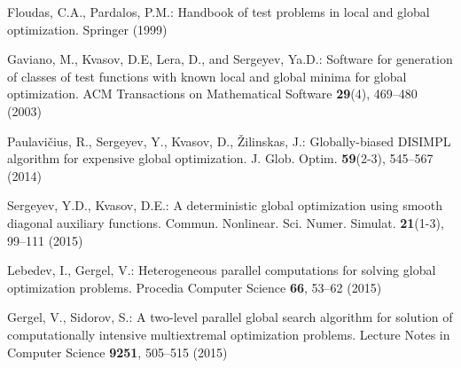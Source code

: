 \documentclass{llncs}
\begin{document}
\begin{thebibliography}{10}
Floudas, C.A., Pardalos, P.M.:  Handbook of test problems in local and global optimization. 
Springer (1999)  %

 Gaviano, M., Kvasov, D.E, Lera, D., and Sergeyev, Ya.D.: Software for 
generation of classes of test functions with known local and global minima for global 
optimization. ACM Transactions on Mathematical Software \textbf{29}(4), 469--480 (2003)

Paulavi\v{c}ius, R., Sergeyev, Y., Kvasov, D., \v{Z}ilinskas, J.: Globally-biased DISIMPL 
algorithm for expensive global optimization. J. Glob. Optim. \textbf{59}(2-3), 545--567 (2014)

Sergeyev, Y.D., Kvasov, D.E.: A deterministic global optimization using smooth diagonal 
auxiliary functions. Commun. Nonlinear. Sci. Numer. Simulat. \textbf{21}(1-3), 99--111 (2015)

Lebedev, I., Gergel, V.: Heterogeneous parallel computations for solving global optimization 
problems. Procedia Computer Science \textbf{66}, 53--62 (2015)

Gergel, V., Sidorov, S.: A two-level parallel global search algorithm for solution of 
computationally intensive multiextremal optimization problems. Lecture Notes in Computer 
Science  \textbf{9251}, 505--515 (2015)



\end{thebibliography}
\end{document}
